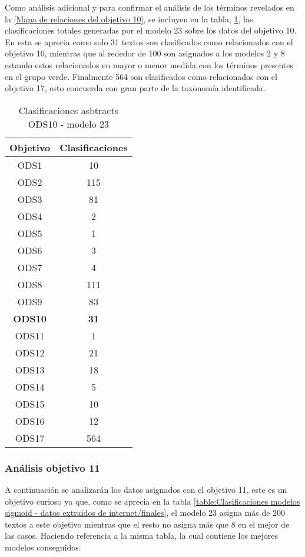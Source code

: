 Como análisis adicional y para confirmar el análisis de los términos revelados
en la \cref{Mapa de relaciones del objetivo 10}, se incluyen en la tabla,
\cref{table:Clasificaciones asbtracts ODS10 - modelo 23}, las clasificaciones
totales generadas por el modelo 23 sobre los datos del objetivo 10. En esta se
aprecia como solo 31 textos son clasificados como relacionados con el objetivo
10, mientras que al rededor de 100 son asignados a los modelos 2 y 8 estando
estos relacionados en mayor o menor medida con los términos presentes en el
grupo verde. Finalmente 564 son clasificados como relacionados con el objetivo
17, esto concuerda con gran parte de la taxonomía identificada. 

\begin{table}[H]
    \begin{tabular}{| c | c |}
        \hline
        Objetivo & Clasificaciones \\
        \hline \hline
        ODS1   & 10  \\ \hline
        ODS2   & 115 \\ \hline
        ODS3   & 81  \\ \hline
        ODS4   & 2   \\ \hline
        ODS5   & 1   \\ \hline
        ODS6   & 3   \\ \hline
        ODS7   & 4   \\ \hline
        ODS8   & 111 \\ \hline
        ODS9   & 83  \\ \hline
        \textbf{ODS10}  & \textbf{31}  \\ \hline
        ODS11  & 1   \\ \hline
        ODS12  & 21  \\ \hline
        ODS13  & 18  \\ \hline
        ODS14  & 5   \\ \hline
        ODS15  & 10  \\ \hline
        ODS16  & 12  \\ \hline
        ODS17  & 564 \\ \hline
    \end{tabular}
    \caption{Clasificaciones asbtracts ODS10 - modelo 23}
    \label{table:Clasificaciones asbtracts ODS10 - modelo 23}
\end{table}


\subsubsection{Análisis objetivo 11}
A continuación se analizarán los datos asignados con el objetivo 11, este es un
objetivo curioso ya que, como se aprecia en la tabla \cref{table:Clasificaciones
modelos sigmoid - datos extraidos de internet/finales}, el modelo 23 asigna más
de 200 textos a este objetivo mientras que el resto no asigna más que 8 en el
mejor de las casos. Haciendo referencia a la misma tabla, la cual contiene los
mejores modelos conseguidos. 

